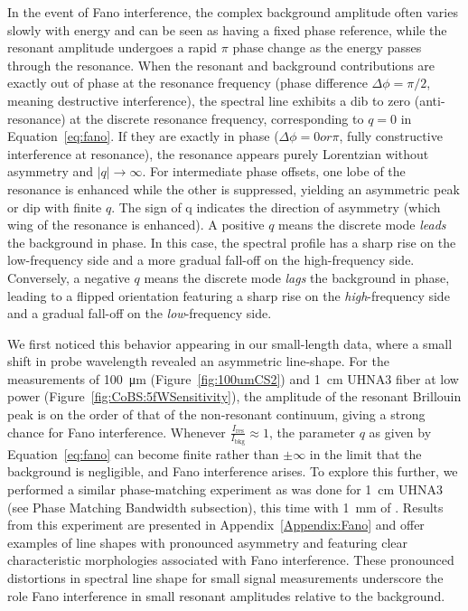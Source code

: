 In the event of Fano interference, the complex background amplitude often varies slowly with energy and can be seen as having a fixed phase reference, while the resonant amplitude undergoes a rapid \(\pi\) phase change as the energy passes through the resonance. \cite{limonov2017fano} When the resonant and background contributions are exactly out of phase at the resonance frequency (phase difference \(\Delta\phi = \pi/2\), meaning destructive interference), the spectral line exhibits a dib to zero (anti-resonance) at the discrete resonance frequency, corresponding to \(q=0\) in Equation~\ref{eq:fano}. If they are exactly in phase (\(\Delta\phi = 0 or \pi\), fully constructive interference at resonance), the resonance appears purely Lorentzian without asymmetry and \(|q| \to \infty\). For intermediate phase offsets, one lobe of the resonance is enhanced while the other is suppressed, yielding an asymmetric peak or dip with finite \(q\). The sign of q indicates the direction of asymmetry (which wing of the resonance is enhanced). A positive \(q\) means the discrete mode \textit{leads} the background in phase. In this case, the spectral profile has a sharp rise on the low-frequency side and a more gradual fall-off on the high-frequency side. Conversely, a negative \(q\) means the discrete mode \textit{lags} the background in phase, leading to a flipped orientation featuring a sharp rise on the \textit{high}-frequency side and a gradual fall-off on the \textit{low}-frequency side.

We first noticed this behavior appearing in our small-length  data, where a small shift in probe wavelength revealed an asymmetric line-shape. For the measurements of \SI{100}{\micro\meter}  (Figure~\ref{fig:100umCS2}) and \SI{1}{\centi\meter} \ac{UHNA3} fiber at low power (Figure~\ref{fig:CoBS:5fWSensitivity}), the amplitude of the resonant Brillouin peak is on the order of that of the non‐resonant continuum, giving a strong chance for Fano interference. Whenever \(\tfrac{I_{\text{res}}}{I_{\text{bkg}}}\approx 1\), the parameter \(q\) as given by Equation~\ref{eq:fano} can become finite rather than \(\pm \infty\) in the limit that the background is negligible, and Fano interference arises. To explore this further, we performed a similar phase-matching experiment as was done for \SI{1}{\centi\meter} \ac{UHNA3} (see Phase Matching Bandwidth subsection), this time with \SI{1}{\milli\meter} of . Results from this experiment are presented in Appendix~\ref{Appendix:Fano} and offer examples of line shapes with pronounced asymmetry and featuring clear characteristic morphologies associated with Fano interference. These pronounced distortions in spectral line shape for small signal measurements underscore the role Fano interference in small resonant amplitudes relative to the background.

